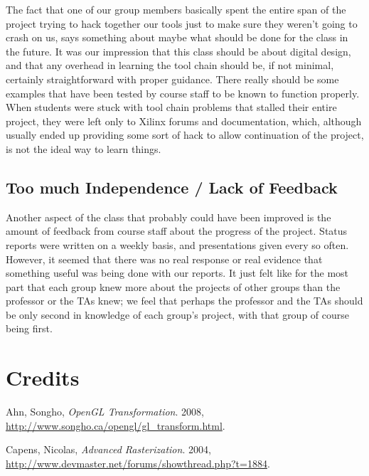 \documentclass[letterpaper,10pt]{article}
\begin{document}
The fact that one of our group members basically spent the entire span of the project trying to hack together our tools just to make sure they weren't going to crash on us, says something about maybe what should be done for the class in the future. It was our impression that this class should be about digital design, and that any overhead in learning the tool chain should be, if not minimal, certainly straightforward with proper guidance. There really should be some examples that have been tested by course staff to be known to function properly. When students were stuck with tool chain problems that stalled their entire project, they were left only to Xilinx forums and documentation, which, although usually ended up providing some sort of hack to allow continuation of the project, is not the ideal way to learn things. 

\subsection{Too much Independence / Lack of Feedback}

Another aspect of the class that probably could have been improved is the amount of feedback from course staff about the progress of the project. Status reports were written on a weekly basis, and presentations given every so often. However, it seemed that there was no real response or real evidence that something useful was being done with our reports. It just felt like for the most part that each group knew more about the projects of other groups than the professor or the TAs knew; we feel that perhaps the professor and the TAs should be only second in knowledge of each group's project, with that group of course being first.

\section{Credits}







\begin{thebibliography}{4}
Ahn, Songho, 
\emph{OpenGL Transformation}.
2008,
\url{http://www.songho.ca/opengl/gl_transform.html}.

Capens, Nicolas, 
\emph{Advanced Rasterization}.
2004,
\url{http://www.devmaster.net/forums/showthread.php?t=1884}.

\end{thebibliography}
\end{document}
